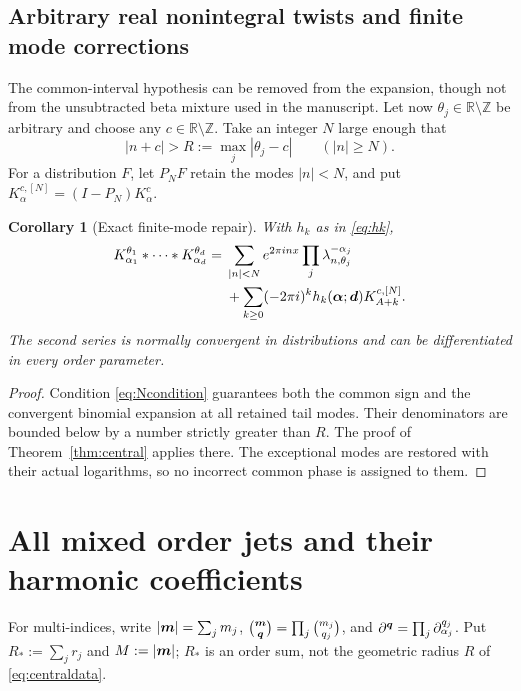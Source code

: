 \documentclass[11pt,a4paper]{article}
\numberwithin{equation}{section}
\newtheorem{corollary}[theorem]{Corollary}
\theoremstyle{definition}\newtheorem{definition}[theorem]{Definition}
\theoremstyle{remark}\newtheorem{remark}[theorem]{Remark}
\newcommand{\Z}{\mathbb Z}\newcommand{\N}{\mathbb N}\newcommand{\C}{\mathbb C}
\newcommand{\av}{\boldsymbol\alpha}\newcommand{\dv}{\boldsymbol d}
\begin{document}
\subsection{Arbitrary real nonintegral twists and finite mode corrections}
The common-interval hypothesis can be removed from the expansion, though
not from the unsubtracted beta mixture used in the manuscript.
Let now $\theta_j\in\mathbb R\setminus\Z$ be arbitrary and choose any
$c\in\mathbb R\setminus\Z$. Take an integer $N$ large enough that
\begin{equation}
 |n+c|>R:=\max_j|\theta_j-c|\qquad (|n|\ge N).
 \label{eq:Ncondition}
\end{equation}
For a distribution $F$, let $P_NF$ retain the modes $|n|<N$, and put
$K_\alpha^{c,[N]}=(I-P_N)K_\alpha^c$.

\begin{corollary}[Exact finite-mode repair]\label{cor:alltwists}
With $h_k$ as in \eqref{eq:hk},
\begin{align}
 K_{\alpha_1}^{\theta_1}*\cdots*K_{\alpha_d}^{\theta_d}
 ={}&\sum_{|n|<N}e^{2\pi inx}
            \prod_j\lambda_{n,\theta_j}^{-\alpha_j}\notag\\
 &+\sum_{k\ge0}(-2\pi i)^kh_k(\av;\dv)
                            K_{A+k}^{c,[N]}.
 \label{eq:headrepair}
\end{align}
The second series is normally convergent in distributions and can be
differentiated in every order parameter.
\end{corollary}
\begin{proof}
Condition \eqref{eq:Ncondition} guarantees both the common sign and the
convergent binomial expansion at all retained tail modes. Their denominators
are bounded below by a number strictly greater than $R$. The proof of
Theorem~\ref{thm:central} applies there. The exceptional modes are restored
with their actual logarithms, so no incorrect common phase is assigned
to them.
\end{proof}

\section{All mixed order jets and their harmonic coefficients}
\label{sec:jets}
For multi-indices, write $|\boldsymbol m|=\sum_jm_j$,
$\binom{\boldsymbol m}{\boldsymbol q}=\prod_j\binom{m_j}{q_j}$, and
$\partial^{\boldsymbol q}=\prod_j\partial_{\alpha_j}^{q_j}$.
Put $R_*:=\sum_jr_j$ and $M:=|\boldsymbol m|$; $R_*$ is an order sum, not the
geometric radius $R$ of \eqref{eq:centraldata}.
\end{document}
